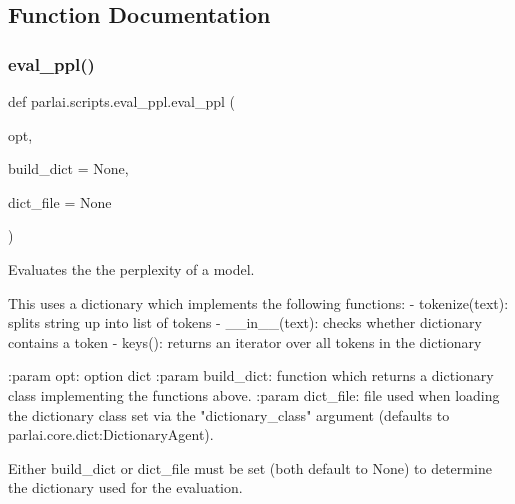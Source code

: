 \subsection{Function Documentation}
\mbox{\label{namespaceparlai_1_1scripts_1_1eval__ppl_ad1a8a8891f276136e82edc906ea58340}} 
\subsubsection{\texorpdfstring{eval\+\_\+ppl()}{eval\_ppl()}}
{\footnotesize\ttfamily def parlai.\+scripts.\+eval\+\_\+ppl.\+eval\+\_\+ppl (\begin{DoxyParamCaption}\item[{}]{opt,  }\item[{}]{build\+\_\+dict = {\ttfamily None},  }\item[{}]{dict\+\_\+file = {\ttfamily None} }\end{DoxyParamCaption})}

\begin{DoxyVerb}Evaluates the the perplexity of a model.

This uses a dictionary which implements the following functions:
- tokenize(text): splits string up into list of tokens
- __in__(text): checks whether dictionary contains a token
- keys(): returns an iterator over all tokens in the dictionary

:param opt: option dict
:param build_dict: function which returns a dictionary class implementing
    the functions above.
:param dict_file: file used when loading the dictionary class set via the
    "dictionary_class" argument (defaults to
    parlai.core.dict:DictionaryAgent).

Either build_dict or dict_file must be set (both default to None) to
determine the dictionary used for the evaluation.
\end{DoxyVerb}
 \mbox{\label{namespaceparlai_1_1scripts_1_1eval__ppl_a4ae22cc04e19c46ed621afeba6e85d67}} 
